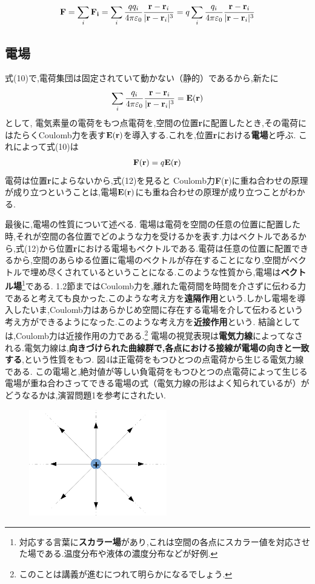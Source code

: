 \documentclass[../main]{subfiles}
\begin{document}
\begin{eqnarray}
{\bf F}=\sum^{}_{i}{\bf F_{i}}=\sum^{}_{i}\frac{qq_{i}}{4\pi \varepsilon_{0}}\frac{{\bf r}-{\bf r}_i}{|{\bf r}-{\bf r}_i|^3}
=q\sum^{}_{i}\frac{q_{i}}{4\pi \varepsilon_{0}}\frac{{\bf r}-{\bf r}_i}{|{\bf r}-{\bf r}_i|^3}
\end{eqnarray}

\subsection{電場}

式(10)で,電荷集団は固定されていて動かない（静的）であるから,新たに
\begin{eqnarray}
\sum^{}_{i}\frac{q_{i}}{4\pi \varepsilon_{0}}\frac{{\bf r}-{\bf r}_i}{|{\bf r}-{\bf r}_i|^3} = {\bf E}({\bf r})
\end{eqnarray}
として, 電気素量の電荷をもつ点電荷を,空間の位置{\bf r}に配置したとき,その電荷にはたらくCoulomb力を表す${\bf E}({\bf r})$を導入する.これを,位置{\bf r}における{\bf 電場}と呼ぶ.
これによって式(10)は
\begin{eqnarray}
{\bf F}({\bf r})= q{\bf E}({\bf r})
\end{eqnarray}
電荷は位置{\bf r}によらないから,式(12)を見ると
Coulomb力{\bf F}({\bf r})に重ね合わせの原理が成り立つということは,電場${\bf E}({\bf r})$にも重ね合わせの原理が成り立つことがわかる.

最後に,電場の性質について述べる.
電場は電荷を空間の任意の位置に配置した時,それが空間の各位置でどのような力を受けるかを表す.力はベクトルであるから,式(12)から位置{\bf r}における電場もベクトルである.電荷は任意の位置に配置できるから,空間のあらゆる位置に電場のベクトルが存在することになり,空間がベクトルで埋め尽くされているということになる.このような性質から,電場は{\bf ベクトル場}\footnote{対応する言葉に{\bf スカラー場}があり,これは空間の各点にスカラー値を対応させた場である.温度分布や液体の濃度分布などが好例.}である.
1.2節まではCoulomb力を,離れた電荷間を時間を介さずに伝わる力であると考えても良かった.このような考え方を{\bf 遠隔作用}という.しかし電場を導入したいま,Coulomb力はあらかじめ空間に存在する電場を介して伝わるという考え方ができるようになった.このような考え方を{\bf 近接作用}という.
結論としては,Coulomb力は近接作用の力である.\footnote{このことは講義が進むにつれて明らかになるでしょう.}
電場の視覚表現は{\bf 電気力線}によってなされる.電気力線は,{\bf 向きづけられた曲線群で,各点における接線が電場の向きと一致する},という性質をもつ.
図4は正電荷をもつひとつの点電荷から生じる電気力線である.
この電場と,絶対値が等しい負電荷をもつひとつの点電荷によって生じる電場が重ね合わさってできる電場の式（電気力線の形はよく知られているが）がどうなるかは,演習問題1を参考にされたい.

\begin{figure}[htbp]
 \begin{center}
  \includegraphics[width=60mm]{1.4.eps}
 \end{center}
 \caption{}
 \label{fig:one}
\end{figure}
\end{document}
